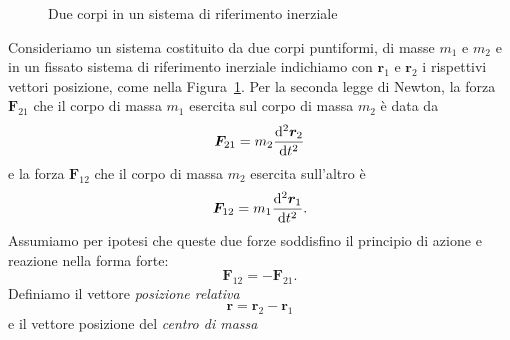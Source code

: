 \begin{figure}
  \centering
  \caption{Due corpi in un sistema di riferimento inerziale}
  \label{fig:due-corpi}
\end{figure}
Consideriamo un sistema costituito da due corpi puntiformi, di masse $m_1$ e
$m_2$ e in un fissato sistema di riferimento inerziale indichiamo con $\bm{r}_1$
e $\bm{r}_2$ i rispettivi vettori posizione, come nella
Figura~\ref{fig:due-corpi}. Per la seconda legge di Newton, la forza
$\bm{F}_{21}$ che il corpo di massa $m_1$ esercita sul corpo di massa $m_2$ è
data da
\begin{equation}
  \label{eq:f21}
  \bm{F}_{21} = m_2\toder[2]{\bm{r}_2}{t}
\end{equation}
e la forza $\bm{F}_{12}$ che il corpo di massa $m_2$ esercita sull'altro è
\begin{equation}
  \label{eq:f12}
  \bm{F}_{12} = m_1\toder[2]{\bm{r}_1}{t}.
\end{equation}
Assumiamo per ipotesi che queste due forze soddisfino il principio di azione e
reazione nella forma forte:
\begin{equation}
  \label{eq:azione-reazione}
  \bm{F}_{12} = -\bm{F}_{21}.
\end{equation}
Definiamo il vettore \emph{posizione relativa}
\begin{equation}
  \label{eq:posizione-relativa}
  \bm{r}=\bm{r}_2-\bm{r}_1
\end{equation}
e il vettore posizione del \emph{centro di massa}

